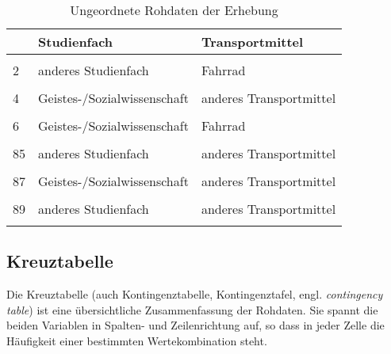 \documentclass[
  ngerman,
]{article}
\begin{document}
\begin{table}

\caption{\label{tab:unnamed-chunk-28}\label{tab:roh}Ungeordnete Rohdaten der Erhebung}
\centering
\begin{tabular}[t]{lll}
\toprule
  & Studienfach & Transportmittel\\
\midrule
\cellcolor{gray!6}{1} & \cellcolor{gray!6}{anderes Studienfach} & \cellcolor{gray!6}{Fahrrad}\\
2 & anderes Studienfach & Fahrrad\\
\cellcolor{gray!6}{3} & \cellcolor{gray!6}{Geistes-/Sozialwissenschaft} & \cellcolor{gray!6}{anderes Transportmittel}\\
4 & Geistes-/Sozialwissenschaft & anderes Transportmittel\\
\cellcolor{gray!6}{5} & \cellcolor{gray!6}{Geistes-/Sozialwissenschaft} & \cellcolor{gray!6}{anderes Transportmittel}\\
6 & Geistes-/Sozialwissenschaft & Fahrrad\\
\cellcolor{gray!6}{...} & \cellcolor{gray!6}{...} & \cellcolor{gray!6}{...}\\
85 & anderes Studienfach & anderes Transportmittel\\
\cellcolor{gray!6}{86} & \cellcolor{gray!6}{anderes Studienfach} & \cellcolor{gray!6}{anderes Transportmittel}\\
87 & Geistes-/Sozialwissenschaft & anderes Transportmittel\\
\cellcolor{gray!6}{88} & \cellcolor{gray!6}{anderes Studienfach} & \cellcolor{gray!6}{anderes Transportmittel}\\
89 & anderes Studienfach & anderes Transportmittel\\
\cellcolor{gray!6}{90} & \cellcolor{gray!6}{Geistes-/Sozialwissenschaft} & \cellcolor{gray!6}{anderes Transportmittel}\\
\bottomrule
\end{tabular}
\end{table}

\hypertarget{kreuztabelle}{%
\subsection{Kreuztabelle}\label{kreuztabelle}}

Die Kreuztabelle (auch Kontingenztabelle, Kontingenztafel, engl. \emph{contingency table}) ist eine übersichtliche Zusammenfassung der Rohdaten. Sie spannt die beiden Variablen in Spalten- und Zeilenrichtung auf, so dass in jeder Zelle die Häufigkeit einer bestimmten Wertekombination steht.
\end{document}
